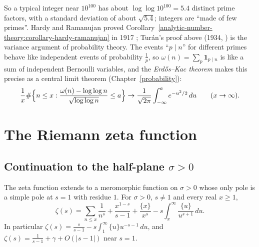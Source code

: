 \begin{remark}\label{analytic-number-theory:remark-erdos-kac}
So a typical integer near $10^{100}$ has about $\log\log 10^{100} = 5.4$ distinct prime factors, with a standard deviation of about $\sqrt{5.4}$; integers are ``made of few primes''. Hardy and
Ramanujan proved Corollary~\ref{analytic-number-theory:corollary-hardy-ramanujan} in 1917 \cite{hardy-ramanujan-1917}; Tur\'an's proof above (1934, \cite{turan-1934}) is the variance argument of
probability theory. The events ``$p \mid n$'' for different primes behave like independent events of probability $\frac1p$, so $\omega(n) = \sum_p\mathbf{1}_{p \mid n}$ is like a sum of independent
Bernoulli variables, and the \emph{Erd\H{o}s--Kac theorem} \cite{erdos-kac-1940} makes this precise as a central limit theorem (Chapter~\ref{probability}):
\[
\frac1x\#\Bigl\{n \leq x : \frac{\omega(n) - \log\log n}{\sqrt{\log\log n}} \leq a\Bigr\} \to \frac{1}{\sqrt{2\pi}}\int_{-\infty}^ae^{-u^2/2}\,du \qquad (x \to \infty).
\]
\end{remark}

\section{The Riemann zeta function}\label{analytic-number-theory:section-zeta}

\subsection{Continuation to the half-plane $\sigma > 0$}\label{analytic-number-theory:subsection-zeta-continuation}

\begin{proposition}\label{analytic-number-theory:proposition-zeta-continuation}
The zeta function extends to a meromorphic function on $\sigma > 0$ whose only pole is a simple pole at $s = 1$ with residue $1$. For $\sigma > 0$, $s \neq 1$ and every real $x \geq 1$,
\begin{equation}\label{analytic-number-theory:equation-zeta-approximate}
\zeta(s) = \sum_{n \leq x}\frac1{n^s} + \frac{x^{1-s}}{s - 1} + \frac{\{x\}}{x^s} - s\int_x^\infty\frac{\{u\}}{u^{s+1}}\,du.
\end{equation}
In particular $\zeta(s) = \frac{s}{s - 1} - s\int_1^\infty\{u\}u^{-s-1}\,du$, and $\zeta(s) = \frac{1}{s - 1} + \gamma + O(|s - 1|)$ near $s = 1$.
\end{proposition}

